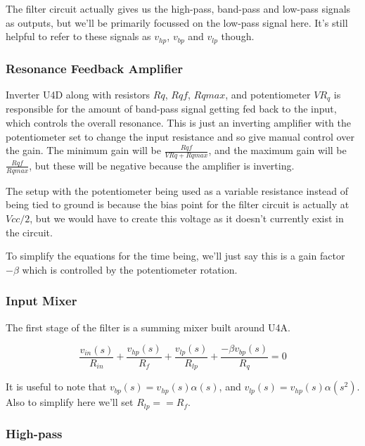 \documentclass{article}
\begin{document}
The filter circuit actually gives us the high-pass, band-pass and low-pass signals as outputs, but we'll be primarily focussed on the low-pass signal here. It's still helpful to refer to these signals as $v_{hp}$, $v_{bp}$ and $v_{lp}$ though.

\subsubsection{Resonance Feedback Amplifier}

Inverter U4D along with resistors $Rq$, $Rqf$, $Rqmax$, and potentiometer $VR_q$ is responsible for the amount of band-pass signal getting fed back to the input, which controls the overall resonance. This is just an inverting amplifier with the potentiometer set to change the input resistance and so give manual control over the gain. The minimum gain will be $\frac{Rqf}{VRq + Rqmax}$, and the maximum gain will be $\frac{Rqf}{Rqmax}$, but these will be negative because the amplifier is inverting.

The setup with the potentiometer being used as a variable resistance instead of being tied to ground is because the bias point for the filter circuit is actually at $Vcc / 2$, but we would have to create this voltage as it doesn't currently exist in the circuit.

To simplify the equations for the time being, we'll just say this is a gain factor $-\beta$ which is controlled by the potentiometer rotation.

\subsubsection{Input Mixer}

The first stage of the filter is a summing mixer built around U4A.


\begin{equation}
  \frac{v_{in}(s)}{R_{in}} + \frac{v_{hp}(s)}{R_f} + \frac{v_{lp}(s)}{R_{lp}}  + \frac{{-\beta}v_{bp}(s)}{R_q} = 0
\end{equation}

It is useful to note that $v_{bp}(s) = v_{hp}(s)\alpha(s)$, and $v_{lp}(s) = v_{hp}(s)\alpha(s^2)$. Also to simplify here we'll set $R_{lp} == R_f$.

\subsubsection{High-pass}
\end{document}
